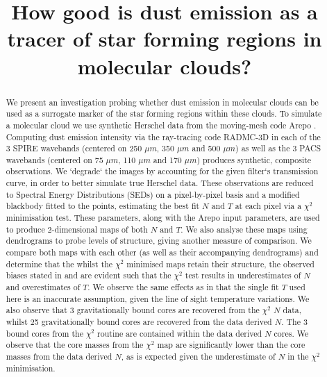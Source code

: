 \documentclass{report}
\title{\vspace{-15mm}\fontsize{24pt}{10pt}\selectfont\textbf{How good is dust emission as a tracer of star forming regions in molecular clouds?}} %
\author{
\large
\textsc{\parbox{\linewidth}{\centering%
Tomas James\endgraf\skip
Student ID: 1158976\endgraf\bigskip}} %
\vspace{-5mm}
}
\date{\large\parbox{\linewidth}{\centering%
  Supervisor: Dr. P. C. Clark \endgraf\bigskip
  Word Count (excluding Bibliography and Appendix)\footnote{According to http://app.uio.no/ifi/texcount/online.php}: 10842 \endgraf\bigskip\today}}
\begin{document}


\maketitle %

\thispagestyle{fancy} %


\begin{abstract}
We present an investigation probing whether dust emission in molecular clouds can be used as a surrogate marker of the star forming regions within these clouds. To simulate a molecular cloud we use synthetic Herschel data from the moving-mesh code Arepo \parencite{arepo}. Computing dust emission intensity via the ray-tracing code RADMC-3D \parencite{RADMC-3D} in each of the 3 SPIRE \parencite{SPIRE} wavebands (centered on 250 $\mu m$, 350 $\mu m$ and 500 $\mu m$) as well as the 3 PACS \parencite{PACS} wavebands (centered on 75 $\mu m$, 110 $\mu m$ and 170 $\mu m$) produces synthetic, composite observations. We `degrade` the images by accounting for the given filter`s transmission curve, in order to better simulate true Herschel data.  These observations are reduced to Spectral Energy Distributions (SEDs) on a pixel-by-pixel basis and a modified blackbody fitted to the points, estimating the best fit $N$ and $T$ at each pixel via a $\chi^{2}$ minimisation test. These parameters, along with the Arepo input parameters, are used to produce 2-dimensional maps of both $N$ and $T$. We also analyse these maps using dendrograms to probe levels of structure, giving another measure of comparison. We compare both maps with each other (as well as their accompanying dendrograms) and determine that the whilst the $\chi^{2}$ minimised maps retain their structure, the observed biases stated in \textcite{noise, noiseb} and \textcite{kelly} are evident such that the $\chi^{2}$ test results in underestimates of $N$ and overestimates of $T$. We observe the same effects as \textcite{noise} in that the single fit $T$ used here is an inaccurate assumption, given the line of sight temperature variations. We also observe that 3 gravitationally bound cores are recovered from the $\chi^{2}$ $N$ data, whilst 25 gravitationally bound cores are recovered from the data derived $N$. The 3 bound cores from the $\chi^{2}$ routine are contained within the data derived $N$ cores. We observe that the core masses from the $\chi^{2}$ map are significantly lower than the core masses from the data derived $N$, as is expected given the underestimate of $N$ in the $\chi^{2}$ minimisation.
\end{abstract}
\end{document}
